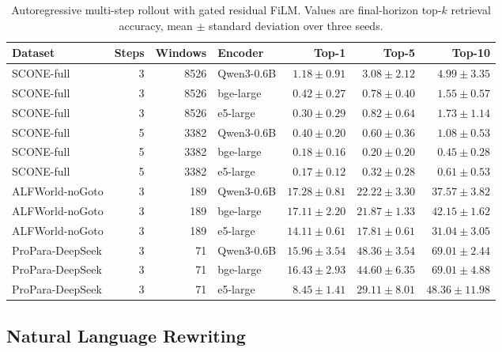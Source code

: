 \documentclass{article}
\begin{document}
\begin{table}[t]
  \centering
  \caption{Autoregressive multi-step rollout with gated residual FiLM. Values are final-horizon top-$k$ retrieval accuracy, mean $\pm$ standard deviation over three seeds.}
  \label{tab:multistep-rollout}
  \small
  \setlength{\tabcolsep}{3.5pt}
  \begin{tabular}{lrrlrrr}
    \toprule
    Dataset & Steps & Windows & Encoder & Top-1 & Top-5 & Top-10 \\
    \midrule
    SCONE-full & 3 & 8526 & Qwen3-0.6B & $1.18{\pm}0.91$ & $3.08{\pm}2.12$ & $4.99{\pm}3.35$ \\
    SCONE-full & 3 & 8526 & bge-large & $0.42{\pm}0.27$ & $0.78{\pm}0.40$ & $1.55{\pm}0.57$ \\
    SCONE-full & 3 & 8526 & e5-large & $0.30{\pm}0.29$ & $0.82{\pm}0.64$ & $1.73{\pm}1.14$ \\
    \midrule
    SCONE-full & 5 & 3382 & Qwen3-0.6B & $0.40{\pm}0.20$ & $0.60{\pm}0.36$ & $1.08{\pm}0.53$ \\
    SCONE-full & 5 & 3382 & bge-large & $0.18{\pm}0.16$ & $0.20{\pm}0.20$ & $0.45{\pm}0.28$ \\
    SCONE-full & 5 & 3382 & e5-large & $0.17{\pm}0.12$ & $0.32{\pm}0.28$ & $0.61{\pm}0.53$ \\
    \midrule
    ALFWorld-noGoto & 3 & 189 & Qwen3-0.6B & $17.28{\pm}0.81$ & $22.22{\pm}3.30$ & $37.57{\pm}3.82$ \\
    ALFWorld-noGoto & 3 & 189 & bge-large & $17.11{\pm}2.20$ & $21.87{\pm}1.33$ & $42.15{\pm}1.62$ \\
    ALFWorld-noGoto & 3 & 189 & e5-large & $14.11{\pm}0.61$ & $17.81{\pm}0.61$ & $31.04{\pm}3.05$ \\
    \midrule
    ProPara-DeepSeek & 3 & 71 & Qwen3-0.6B & $15.96{\pm}3.54$ & $48.36{\pm}3.54$ & $69.01{\pm}2.44$ \\
    ProPara-DeepSeek & 3 & 71 & bge-large & $16.43{\pm}2.93$ & $44.60{\pm}6.35$ & $69.01{\pm}4.88$ \\
    ProPara-DeepSeek & 3 & 71 & e5-large & $8.45{\pm}1.41$ & $29.11{\pm}8.01$ & $48.36{\pm}11.98$ \\
    \bottomrule
  \end{tabular}
\end{table}

\subsection{Natural Language Rewriting}
\end{document}
